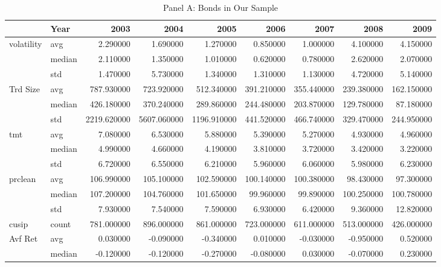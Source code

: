 \documentclass{article}
\begin{document}
\begin{landscape}

\begin{table}[ht]
\centering
\caption{Panel A: Bonds in Our Sample}

\begin{tabular}{llrrrrrrr}
\toprule
 & Year & 2003 & 2004 & 2005 & 2006 & 2007 & 2008 & 2009 \\
\midrule
\multirow[t]{3}{*}{volatility} & avg & 2.290000 & 1.690000 & 1.270000 & 0.850000 & 1.000000 & 4.100000 & 4.150000 \\
 & median & 2.110000 & 1.350000 & 1.010000 & 0.620000 & 0.780000 & 2.620000 & 2.070000 \\
 & std & 1.470000 & 5.730000 & 1.340000 & 1.310000 & 1.130000 & 4.720000 & 5.140000 \\
\cline{1-9}
\multirow[t]{3}{*}{Trd Size} & avg & 787.930000 & 723.920000 & 512.340000 & 391.210000 & 355.440000 & 239.380000 & 162.150000 \\
 & median & 426.180000 & 370.240000 & 289.860000 & 244.480000 & 203.870000 & 129.780000 & 87.180000 \\
 & std & 2219.620000 & 5607.060000 & 1196.910000 & 441.520000 & 466.740000 & 329.470000 & 244.950000 \\
\cline{1-9}
\multirow[t]{3}{*}{tmt} & avg & 7.080000 & 6.530000 & 5.880000 & 5.390000 & 5.270000 & 4.930000 & 4.960000 \\
 & median & 4.990000 & 4.660000 & 4.190000 & 3.810000 & 3.720000 & 3.420000 & 3.220000 \\
 & std & 6.720000 & 6.550000 & 6.210000 & 5.960000 & 6.060000 & 5.980000 & 6.230000 \\
\cline{1-9}
\multirow[t]{3}{*}{prclean} & avg & 106.990000 & 105.100000 & 102.590000 & 100.140000 & 100.380000 & 98.430000 & 97.300000 \\
 & median & 107.200000 & 104.760000 & 101.650000 & 99.960000 & 99.890000 & 100.250000 & 100.780000 \\
 & std & 7.930000 & 7.540000 & 7.590000 & 6.930000 & 6.420000 & 9.360000 & 12.820000 \\
\cline{1-9}
cusip & count & 781.000000 & 896.000000 & 861.000000 & 723.000000 & 611.000000 & 513.000000 & 426.000000 \\
\cline{1-9}
\multirow[t]{3}{*}{Avf Ret} & avg & 0.030000 & -0.090000 & -0.340000 & 0.010000 & -0.030000 & -0.950000 & 0.520000 \\
 & median & -0.120000 & -0.120000 & -0.270000 & -0.080000 & 0.030000 & -0.070000 & 0.230000 \\

\end{tabular}
\end{table}
\end{landscape}
\end{document}
